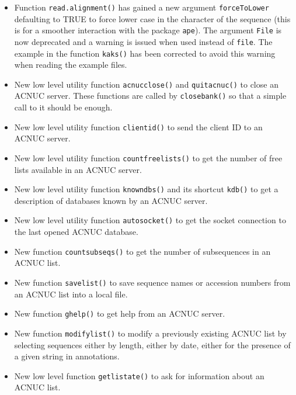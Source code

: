 \documentclass{article}
\begin{document}
\begin{itemize}
\item Function \texttt{read.alignment()} has gained a new argument
  \texttt{forceToLower} defaulting to TRUE to force lower case in
  the character of the sequence (this is for a smoother interaction
  with the package \texttt{ape}). The argument \texttt{File} is now
  deprecated and a warning is issued when used instead of \texttt{file}.
  The example in the function \texttt{kaks()} has been corrected
  to avoid this warning when reading the example files.

\item New low level utility function \texttt{acnucclose()} and
  \texttt{quitacnuc()} to close an ACNUC server. These functions
  are called by \texttt{closebank()} so that a simple call to
  it should be enough.

\item New low level utility function \texttt{clientid()} to
  send the client ID to an ACNUC server.

\item New low level utility function \texttt{countfreelists()} to
  get the number of free lists available in an ACNUC server.

\item New low level utility function \texttt{knowndbs()} and its
  shortcut \texttt{kdb()} to get a description of databases
  known by an ACNUC server.

\item New low level utility function \texttt{autosocket()} to get the
  socket connection to the last opened ACNUC database.

\item New function \texttt{countsubseqs()} to get the number of
  subsequences in an ACNUC list.

\item New function \texttt{savelist()} to save sequence names or
  accession numbers from an ACNUC list into a local file.

\item New function \texttt{ghelp()} to get help from an ACNUC server.

\item New function \texttt{modifylist()} to modify a previously existing
  ACNUC list by selecting sequences either by length, either by date,
  either for the presence of a given string in annotations.

\item New low level function \texttt{getlistate()} to ask for
  information about an ACNUC list.


\end{itemize}
\end{document}
